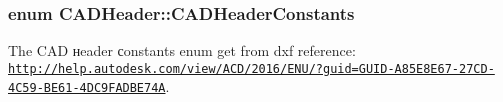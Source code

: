 \subsubsection[{\texorpdfstring{C\+A\+D\+Header\+Constants}{CADHeaderConstants}}]{\setlength{\rightskip}{0pt plus 5cm}enum {\bf C\+A\+D\+Header\+::\+C\+A\+D\+Header\+Constants}}\hypertarget{class_c_a_d_header_abd894aab7aa85b4c4634e67fb93d6886}{}\label{class_c_a_d_header_abd894aab7aa85b4c4634e67fb93d6886}


The C\+AD нeader сonstants enum get from dxf reference\+: \href{http://help.autodesk.com/view/ACD/2016/ENU/?guid=GUID-A85E8E67-27CD-4C59-BE61-4DC9FADBE74A}{\tt http\+://help.\+autodesk.\+com/view/\+A\+C\+D/2016/\+E\+N\+U/?guid=\+G\+U\+I\+D-\/\+A85\+E8\+E67-\/27\+C\+D-\/4\+C59-\/\+B\+E61-\/4\+D\+C9\+F\+A\+D\+B\+E74A}. 


